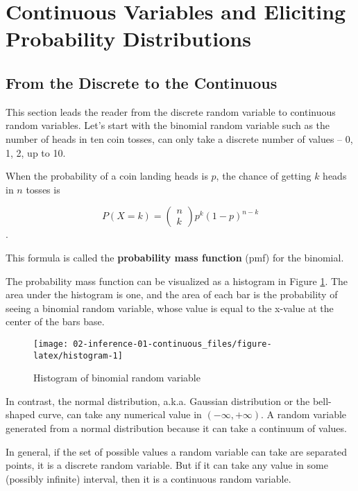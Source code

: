 \documentclass[]{book}
\theoremstyle{definition}
\theoremstyle{definition}
\theoremstyle{definition}
\theoremstyle{remark}
\begin{document}
\section{Continuous Variables and Eliciting Probability
Distributions}\label{continuous-variables-and-eliciting-probability-distributions}

\subsection{From the Discrete to the
Continuous}\label{from-the-discrete-to-the-continuous}

This section leads the reader from the discrete random variable to
continuous random variables. Let's start with the binomial random
variable such as the number of heads in ten coin tosses, can only take a
discrete number of values -- 0, 1, 2, up to 10.

When the probability of a coin landing heads is \(p\), the chance of
getting \(k\) heads in \(n\) tosses is

\[P(X = k) = \left( \begin{array}{c} n \\ k \end{array} \right) p^k (1-p)^{n-k}\].

This formula is called the \textbf{probability mass function} (pmf) for
the binomial.

The probability mass function can be visualized as a histogram in Figure
\ref{fig:histogram}. The area under the histogram is one, and the area
of each bar is the probability of seeing a binomial random variable,
whose value is equal to the x-value at the center of the bars base.

\begin{figure}

{\centering \texttt{[image: 02-inference-01-continuous\_files/figure-latex/histogram-1]} 

}

\caption{Histogram of binomial random variable}\label{fig:histogram}
\end{figure}

In contrast, the normal distribution, a.k.a. Gaussian distribution or
the bell-shaped curve, can take any numerical value in
\((-\infty,+\infty)\). A random variable generated from a normal
distribution because it can take a continuum of values.

In general, if the set of possible values a random variable can take are
separated points, it is a discrete random variable. But if it can take
any value in some (possibly infinite) interval, then it is a continuous
random variable.
\end{document}

